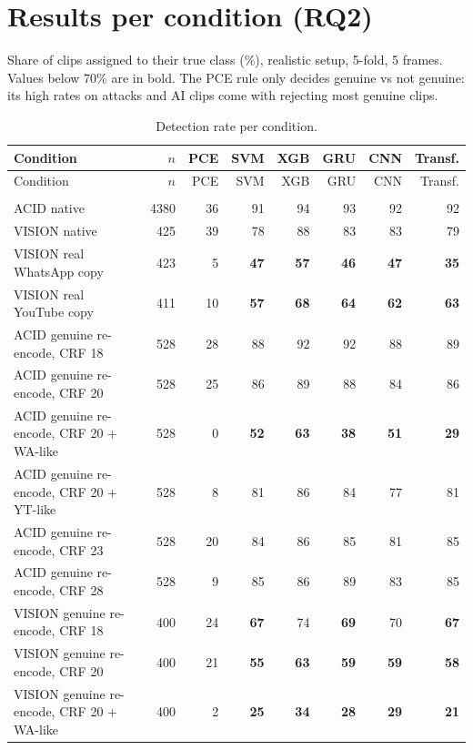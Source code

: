 \documentclass[11pt,a4paper]{article}
\begin{document}
\section{Results per condition (RQ2)}
Share of clips assigned to their true class (\%), realistic setup, 5-fold, 5 frames. Values below 70\% are in bold. The PCE rule only decides genuine vs not genuine: its high rates on attacks and AI clips come with rejecting most genuine clips.
{\small\setlength{\tabcolsep}{4pt}\begin{longtable}{p{7.2cm}rrrrrrr}
\caption{Detection rate per condition.}\label{tab:cond}\\\toprule Condition & $n$ & PCE & SVM & XGB & GRU & CNN & Transf. \\\endfirsthead\toprule Condition & $n$ & PCE & SVM & XGB & GRU & CNN & Transf. \\\endhead\bottomrule\endfoot
\midrule\multicolumn{8}{l}{\textbf{Genuine (organic)}} \\
ACID native & 4380 & 36 & 91 & 94 & 93 & 92 & 92 \\
VISION native & 425 & 39 & 78 & 88 & 83 & 83 & 79 \\
VISION real WhatsApp copy & 423 & 5 & \textbf{47} & \textbf{57} & \textbf{46} & \textbf{47} & \textbf{35} \\
VISION real YouTube copy & 411 & 10 & \textbf{57} & \textbf{68} & \textbf{64} & \textbf{62} & \textbf{63} \\
ACID genuine re-encode, CRF 18 & 528 & 28 & 88 & 92 & 92 & 88 & 89 \\
ACID genuine re-encode, CRF 20 & 528 & 25 & 86 & 89 & 88 & 84 & 86 \\
ACID genuine re-encode, CRF 20 + WA-like & 528 & 0 & \textbf{52} & \textbf{63} & \textbf{38} & \textbf{51} & \textbf{29} \\
ACID genuine re-encode, CRF 20 + YT-like & 528 & 8 & 81 & 86 & 84 & 77 & 81 \\
ACID genuine re-encode, CRF 23 & 528 & 20 & 84 & 86 & 85 & 81 & 85 \\
ACID genuine re-encode, CRF 28 & 528 & 9 & 85 & 86 & 89 & 83 & 85 \\
VISION genuine re-encode, CRF 18 & 400 & 24 & \textbf{67} & 74 & \textbf{69} & 70 & \textbf{67} \\
VISION genuine re-encode, CRF 20 & 400 & 21 & \textbf{55} & \textbf{63} & \textbf{59} & \textbf{59} & \textbf{58} \\
VISION genuine re-encode, CRF 20 + WA-like & 400 & 2 & \textbf{25} & \textbf{34} & \textbf{28} & \textbf{29} & \textbf{21} \\

\end{longtable}}
\end{document}
